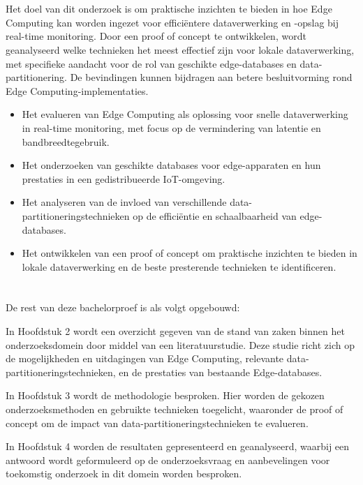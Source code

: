 \section{}%
\label{sec:onderzoeksdoelstelling}
Het doel van dit onderzoek is om praktische inzichten te bieden in hoe Edge Computing kan worden ingezet voor efficiëntere dataverwerking en -opslag bij real-time monitoring. Door een proof of concept te ontwikkelen, wordt geanalyseerd welke technieken het meest effectief zijn voor lokale dataverwerking, met specifieke aandacht voor de rol van geschikte edge-databases en data-partitionering. De bevindingen kunnen bijdragen aan betere besluitvorming rond Edge Computing-implementaties.

\begin{itemize}
\item Het evalueren van Edge Computing als oplossing voor snelle dataverwerking in real-time monitoring, met focus op de vermindering van latentie en bandbreedtegebruik.
\item Het onderzoeken van geschikte databases voor edge-apparaten en hun prestaties in een gedistribueerde IoT-omgeving.
\item Het analyseren van de invloed van verschillende data-partitioneringstechnieken op de efficiëntie en schaalbaarheid van edge-databases.
\item Het ontwikkelen van een proof of concept om praktische inzichten te bieden in lokale dataverwerking en de beste presterende technieken te identificeren.
\end{itemize}

\section{}%
\label{sec:opzet-bachelorproef}

De rest van deze bachelorproef is als volgt opgebouwd:

In Hoofdstuk 2 wordt een overzicht gegeven van de stand van zaken binnen het onderzoeksdomein door middel van een literatuurstudie. Deze studie richt zich op de mogelijkheden en uitdagingen van Edge Computing, relevante data-partitioneringstechnieken, en de prestaties van bestaande Edge-databases.

In Hoofdstuk 3 wordt de methodologie besproken. Hier worden de gekozen onderzoeksmethoden en gebruikte technieken toegelicht, waaronder de proof of concept om de impact van data-partitioneringstechnieken te evalueren.

In Hoofdstuk 4 worden de resultaten gepresenteerd en geanalyseerd, waarbij een antwoord wordt geformuleerd op de onderzoeksvraag en aanbevelingen voor toekomstig onderzoek in dit domein worden besproken.